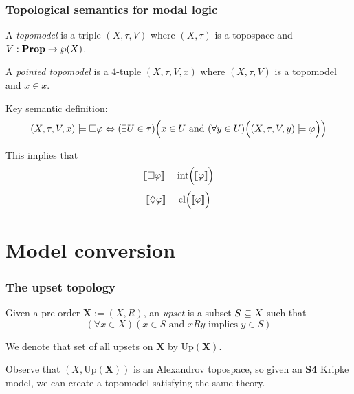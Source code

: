 \documentclass[
	11pt, %
	aspectratio=1610, %
]{beamer}
\begin{document}
\begin{frame}
	\frametitle{Topological semantics for modal logic}

	A \emph{topomodel} is a triple $(X, \tau, V)$ where $(X, \tau)$ is a topospace and $V: \mathbf{Prop} \to \wp(X)$.

	\bigskip

	A \emph{pointed topomodel} is a 4-tuple $(X, \tau, V, x)$ where $(X, \tau, V)$ is a topomodel and $x \in x$.

	\bigskip

	Key semantic definition:
		\[ (X, \tau, V, x) \models \Box \varphi \Leftrightarrow (\exists U \in \tau)\Bigl(x \in U \text{ and } (\forall y \in U)\Bigl((X, \tau, V, y)\models \varphi\Bigr)\Bigr) \]

	\bigskip

	This implies that
		\[ [\![\Box \varphi]\!] = \text{int}\Bigl([\![\varphi]\!]\Bigr)\]
		\[ [\![\Diamond \varphi]\!] = \text{cl}\Bigl([\![\varphi]\!]\Bigr)\]

\end{frame}


\section{Model conversion}


\begin{frame}
	\frametitle{The upset topology}

	Given a pre-order $\mathbf{X} := (X, R)$, an \emph{upset} is a subset $S \subseteq X$ such that
		\[ (\forall x \in X)(x \in S \text{ and } xRy \text{ implies } y \in S) \]

	\bigskip

	We denote that set of all upsets on $\mathbf{X}$ by $\text{Up}(\mathbf{X})$.

	\bigskip

	Observe that $(X, \text{Up}(\mathbf{X}))$ is an Alexandrov topospace, so given an \textbf{S4} Kripke model, we can create a topomodel satisfying the same theory.

\end{frame}

\end{document}
